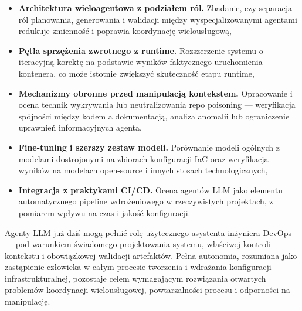 \begin{itemize}
    \item \textbf{Architektura wieloagentowa z podziałem ról.} Zbadanie, czy separacja ról planowania, generowania i walidacji między wyspecjalizowanymi agentami redukuje zmienność i poprawia koordynację wielousługową,

    \item \textbf{Pętla sprzężenia zwrotnego z runtime.} Rozszerzenie systemu o iteracyjną korektę na podstawie wyników faktycznego uruchomienia kontenera, co może istotnie zwiększyć skuteczność etapu runtime,

    \item \textbf{Mechanizmy obronne przed manipulacją kontekstem.} Opracowanie i ocena technik wykrywania lub neutralizowania repo poisoning — weryfikacja spójności między kodem a dokumentacją, analiza anomalii lub ograniczenie uprawnień informacyjnych agenta,

    \item \textbf{Fine-tuning i szerszy zestaw modeli.} Porównanie modeli ogólnych z modelami dostrojonymi na zbiorach konfiguracji IaC oraz weryfikacja wyników na modelach open-source i innych stosach technologicznych,

    \item \textbf{Integracja z praktykami CI/CD.} Ocena agentów LLM jako elementu automatycznego pipeline wdrożeniowego w rzeczywistych projektach, z pomiarem wpływu na czas i jakość konfiguracji.
\end{itemize}

Agenty LLM już dziś mogą pełnić rolę użytecznego asystenta inżyniera DevOps — pod warunkiem świadomego projektowania systemu, właściwej kontroli kontekstu i obowiązkowej walidacji artefaktów. Pełna autonomia, rozumiana jako zastąpienie człowieka w całym procesie tworzenia i wdrażania konfiguracji infrastrukturalnej, pozostaje celem wymagającym rozwiązania otwartych problemów koordynacji wielousługowej, powtarzalności procesu i odporności na manipulację.
